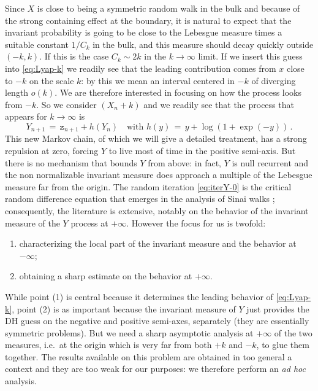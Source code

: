 \documentclass[reqno,11pt]{amsart}
\numberwithin{equation}{section}
\newcommand{\logZ}{\mathtt{z}}
\begin{document}
Since $X$ is  close to being a symmetric random walk in the bulk and because of the strong containing effect at the boundary, it is natural to expect that the invariant probability is going to be close to the Lebesgue measure times a suitable constant $1/C_k$ in the bulk, and this measure should decay quickly outside  $(-k, k)$. If this is the case $C_k \sim 
2k$ in the $k\to \infty$ limit.  If we insert this guess into \eqref{eq:Lyap-k} 
we readily see that the leading contribution comes from $x$ close to $-k$ on the scale $k$: by this we mean an interval centered in $-k$ of diverging length $o(k)$.  
We are therefore interested in focusing on how the process looks from $-k$. So we consider 
$(X_n+k)$ and  we readily see that  the process that appears for  $k\to \infty$ is 
\begin{equation}
\label{eq:iterY-0}
Y_{n+1}\, =\,  \logZ_{n+1} + h\left(Y_n \right)\ \ \ \text{ with } h(y)\, =\, y+ \log(1+\exp(-y))\, .
\end{equation}
This new Markov chain, of which we will give a detailed treatment, has a strong repulsion at zero, forcing $Y$ to live most of time in the positive semi-axis. But there is no mechanism that bounds $Y$ from above: in fact, $Y$ is null recurrent and the non normalizable invariant measure does approach a multiple of the Lebesgue measure far from the origin.  The
random iteration \eqref{eq:iterY-0} is the critical
  random difference  equation that emerges in the analysis of 
Sinai walks \cite{cf:BBE,cf:BBD,cf:BDMbook,cf:Sinai}; consequently, the literature is extensive, notably  on the behavior of the invariant measure of the $Y$ process at $+\infty$. However the focus for us is twofold: 
\smallskip

\begin{enumerate}[leftmargin=*]
\item characterizing the local part of the invariant measure and the behavior at $-\infty$;
\item obtaining a sharp estimate on the behavior at $+\infty$. 
\end{enumerate} 

\smallskip

While point (1) is central because it determines the leading behavior of \eqref{eq:Lyap-k}, point (2) is as important because 
the invariant measure of $Y$ just provides  the DH guess on the negative and positive  semi-axes, separately (they are essentially symmetric problems). 
But we need a 
 sharp asymptotic analysis at $+\infty$ of the two measures, i.e.\ at the origin which is very far from both $+k$ and $-k$, to glue them together. The results available on this problem are obtained in too general a context and they are too weak for our purposes: we therefore perform  an \emph{ad hoc} analysis. 
 
\end{document}
